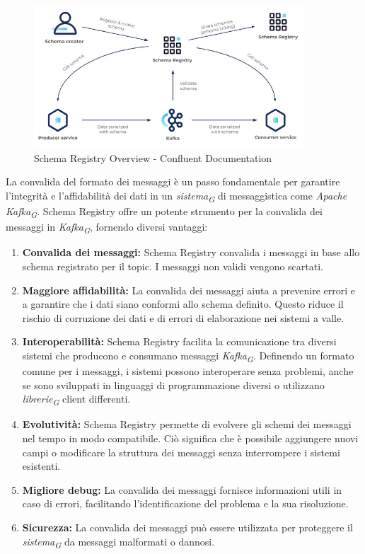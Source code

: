 \begin{figure}[H]
    \centering
    \includegraphics[width=0.9\textwidth]{../Images/SpecificaTecnica/schemaRegistry.jpg}
    \caption{Schema Registry Overview - Confluent Documentation}
    \label{fig:schemaReg}
  \end{figure}
La convalida del formato dei messaggi è un passo fondamentale per garantire l'integrità e l'affidabilità dei dati in un \textit{sistema}\textsubscript{\textit{G}} di messaggistica come \textit{Apache Kafka}\textsubscript{\textit{G}}. Schema Registry offre un potente strumento per la convalida dei messaggi in \textit{Kafka}\textsubscript{\textit{G}}, fornendo diversi vantaggi:
\begin{enumerate}
    \item \textbf{Convalida dei messaggi:} Schema Registry convalida i messaggi in base allo schema registrato per il topic. I messaggi non validi vengono scartati.
    \item \textbf{Maggiore affidabilità:} La convalida dei messaggi aiuta a prevenire errori e a garantire che i dati siano conformi allo schema definito. Questo riduce il rischio di corruzione dei dati e di errori di elaborazione nei sistemi a valle.
    \item \textbf{Interoperabilità:} Schema Registry facilita la comunicazione tra diversi sistemi che producono e consumano messaggi \textit{Kafka}\textsubscript{\textit{G}}. Definendo un formato comune per i messaggi, i sistemi possono interoperare senza problemi, anche se sono sviluppati in linguaggi di programmazione diversi o utilizzano \textit{librerie}\textsubscript{\textit{G}} client differenti.
    \item \textbf{Evolutività:} Schema Registry permette di evolvere gli schemi dei messaggi nel tempo in modo compatibile. Ciò significa che è possibile aggiungere nuovi campi o modificare la struttura dei messaggi senza interrompere i sistemi esistenti.
    \item \textbf{Migliore debug:} La convalida dei messaggi fornisce informazioni utili in caso di errori, facilitando l'identificazione del problema e la sua risoluzione.
    \item \textbf{Sicurezza:} La convalida dei messaggi può essere utilizzata per proteggere il \textit{sistema}\textsubscript{\textit{G}} da messaggi malformati o dannosi.
    
\end{enumerate}

